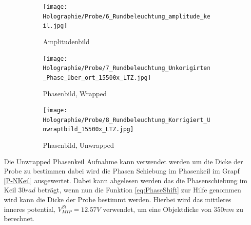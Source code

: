 \begin{figure}
     \centering
     \begin{subfigure}[b]{0.3\textwidth}
         \centering
         \texttt{[image: Holographie/Probe/6\_Rundbeleuchtung\_amplitude\_keil.jpg]}
         \caption{Amplitudenbild}
         \label{P-NAmp}
     \end{subfigure}
     \hfill
     \begin{subfigure}[b]{0.3\textwidth}
         \centering
         \texttt{[image: Holographie/Probe/7\_Rundbeleuchtung\_Unkorigirten\_Phase\_über\_ort\_15500x\_LTZ.jpg]}
         \caption{Phasenbild, Wrapped}
         \label{P-NPhaseW}
     \end{subfigure}
     \hfill
     \begin{subfigure}[b]{0.3\textwidth}
         \centering
         \texttt{[image: Holographie/Probe/8\_Rundbeleuchtung\_Korrigiert\_Unwraptbild\_15500x\_LTZ.jpg]}
         \caption{Phasenbild, Unwrapped}
         \label{P-NphaseU}
     \end{subfigure}
        \caption{}
        \label{P-NTEMÜber}
\end{figure}

Die Unwrapped Phasenkeil Aufnahme kann verwendet werden um die Dicke der Probe zu bestimmen dabei wird die Phasen Schiebung im Phasenkeil im Grapf \cref{P-NKeil} ausgewertet. Dabei kann abgelesen werden das die Phasenschiebung im Keil \(30 rad\) beträgt, wenn nun die Funktion \cref{eq:PhaseShift} zur Hilfe genommen wird kann die Dicke der Probe bestimmt werden. Hierbei wird das mittleres inneres potential, \(V^{Si}_{MIP} = 12.57V\) verwendet, um eine Objektdicke von \(350nm\) zu berechnet.

